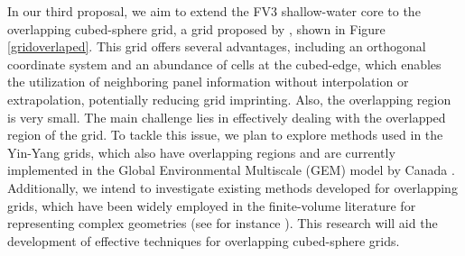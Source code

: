In our third proposal, we aim to extend the FV3 shallow-water core to the overlapping cubed-sphere grid, a grid proposed by \citet{purser:2017}, shown in Figure \ref{gridoverlaped}.
This grid offers several advantages, including an orthogonal coordinate system and an abundance of cells at the cubed-edge,
which enables the utilization of neighboring panel information without interpolation or extrapolation, potentially reducing grid imprinting.
Also, the overlapping region is very small.
The main challenge lies in effectively dealing with the overlapped region of the grid. To tackle this issue, we plan to explore methods used in the Yin-Yang grids, which also have overlapping regions and are currently implemented in the Global Environmental Multiscale (GEM) model by Canada \citep{qaddouri:2011,husain:2019}.
Additionally, we intend to investigate existing methods developed for overlapping grids, which have been widely employed in the finite-volume literature for representing complex geometries
(see for instance \citet{hadzic:2005}).
This research will aid the development of effective techniques for overlapping cubed-sphere grids.
